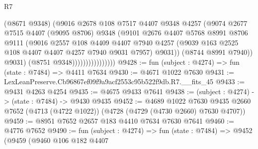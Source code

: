 \begin{lexlean}{R7}
\begin{coremodule}
                                  (@8671 @9348)
                                  (@9016
                                    @2678
                                    @108
                                    @7517
                                    @4407
                                    @9348
                                    @4257
                                    (@9074
                                      @2677
                                      @7515
                                      @4407
                                      (@9095 @8706)
                                      @9348
                                      (@9101
                                        @2676
                                        @4407
                                        @5768
                                        @8991
                                        @8706
                                        @9111
                                        (@9016
                                          @2557
                                          @108
                                          @4409
                                          @4407
                                          @7940
                                          @4257
                                          (@9039
                                            @163
                                            @2525
                                            @108
                                            @4407
                                            @4407
                                            @4257
                                            @7940
                                            @9031
                                            @7957)
                                          @9031))
                                      (@8744 @8991 @7940))
                                    @9031)
                                  (@8751 @9348))))))))))))))))
@9428 := fun (subject : @4274) => fun (state : @7484) => @4411 @7634
@9430 := @4671 @1022 @7630
@9431 := LexLeanPreserve.Cb96867ef09f9a9acf2553c95b522f9db.R7.__fits_45
@9433 := @9431 @4263 @4254
@9435 := @4675 @9433 @7641
@9438 := (subject : @4274) -> (state : @7484) -> @9430 @9435
@9452 := @4689
    @1022
    @7630
    @9435
    @2660
    @7652
    (@4713 (@4722 @1022))
    (@4728 (@4729 (@4730 @2660) @7630 @4707))
@9459 := @8951 @7652 @2657 @183 @4410 @7634 @7630 @7641
@9460 := @4776 @7652
@9490 := fun (subject : @4274) =>
  fun (state : @7484) =>
  @9452
    (@9459
      (@9460
        @106
        @182
        @4407

\end{coremodule}
\end{lexlean}
